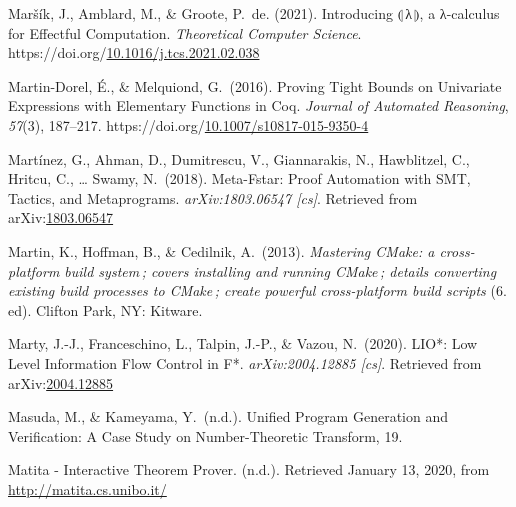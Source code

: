 \documentclass[12pt,twoside]{article}
\begin{document}
{\begin{thebibliography}{1079}
\mdbibitemlabel{}Maršík, J., Amblard, M., \& Groote, P.~de. (2021). Introducing ⦇ λ ⦈, a λ-calculus for Effectful Computation. \emph{Theoretical Computer Science}. https://doi.org/\href{https://dx.doi.org/10.1016/j.tcs.2021.02.038}{10.1016/j.tcs.2021.02.038}%

\mdbibitemlabel{}Martin-Dorel, É., \& Melquiond, G.~(2016). Proving Tight Bounds on Univariate Expressions with Elementary Functions in Coq. \emph{Journal of Automated Reasoning}, \emph{57}(3), 187–217. https://doi.org/\href{https://dx.doi.org/10.1007/s10817-015-9350-4}{10.1007/s10817-015-9350-4}%

\mdbibitemlabel{}Martínez, G., Ahman, D., Dumitrescu, V., Giannarakis, N., Hawblitzel, C., Hritcu, C., … Swamy, N.~(2018). Meta-Fstar: Proof Automation with SMT, Tactics, and Metaprograms. \emph{arXiv:1803.06547 {}[cs]}. Retrieved from arXiv:\href{http://arxiv.org/abs/1803.06547}{1803.06547}%

\mdbibitemlabel{}Martin, K., Hoffman, B., \& Cedilnik, A.~(2013). \emph{Mastering CMake: a cross-platform build system ; covers installing and running CMake ; details converting existing build processes to CMake ; create powerful cross-platform build scripts} (6. ed). Clifton Park, NY: Kitware.%

\mdbibitemlabel{}Marty, J.-J., Franceschino, L., Talpin, J.-P., \& Vazou, N.~(2020). LIO*: Low Level Information Flow Control in F*. \emph{arXiv:2004.12885 {}[cs]}. Retrieved from arXiv:\href{http://arxiv.org/abs/2004.12885}{2004.12885}%

\mdbibitemlabel{}Masuda, M., \& Kameyama, Y.~(n.d.). Uniﬁed Program Generation and Veriﬁcation: A Case Study on Number-Theoretic Transform, 19.%

\mdbibitemlabel{}Matita - Interactive Theorem Prover. (n.d.). Retrieved January 13, 2020, from \href{http://matita.cs.unibo.it/}{{\ttfamily http://\hspace{0pt}matita.\hspace{0pt}cs.\hspace{0pt}unibo.\hspace{0pt}it/\hspace{0pt}}}%


\end{thebibliography}}
\end{document}
